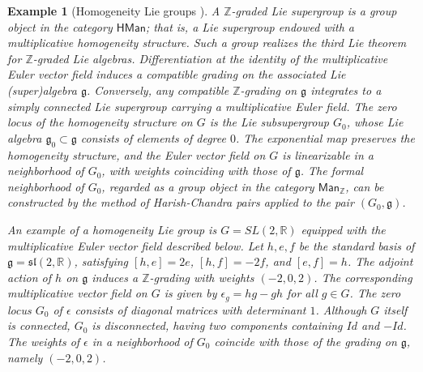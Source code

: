 \documentclass[a4paper,12pt]{amsart}
\newtheorem{example}{Example}
\begin{document}
\begin{example}[Homogeneity Lie groups \cite{KS-HCP}]\label{ex:homogeneity_group}\normalfont
    A $\mathbb{Z}$-graded Lie supergroup is a group object in the category 
$\mathsf{HMan}$; that is, a Lie supergroup endowed with a multiplicative 
homogeneity structure. Such a group realizes the third Lie theorem 
for $\mathbb{Z}$-graded Lie algebras. 
Differentiation at the identity of the multiplicative Euler vector field 
induces a compatible grading on the associated Lie (super)algebra 
$\mathfrak{g}$. Conversely, any compatible $\mathbb{Z}$-grading on 
$\mathfrak{g}$ integrates to a simply connected Lie supergroup 
carrying a multiplicative Euler field. 
The zero locus of the homogeneity structure on $G$ is the Lie subsupergroup $G_0$, whose Lie algebra $\mathfrak{g}_0 \subset \mathfrak{g}$ consists of 
elements of degree $0$. The exponential map preserves the homogeneity 
structure, and the Euler vector field on $G$ is linearizable in a neighborhood of $G_0$, with weights coinciding with those of $\mathfrak{g}$. The formal neighborhood of $G_0$, regarded as a group object in the category 
$\mathsf{Man}_{\mathbb{Z}}$, can be constructed by the method of Harish-Chandra pairs 
applied to the pair $(G_0, \mathfrak{g})$. 

\smallskip\noindent
An example of a homogeneity Lie group is $G = SL(2, \mathbb{R})$ equipped with 
the multiplicative Euler vector field described below. Let $h, e, f$ be the standard 
basis of $\mathfrak{g} = \mathfrak{sl}(2, \mathbb{R})$, satisfying 
$[h, e] = 2e$, $[h, f] = -2f$, and $[e, f] = h$. The adjoint action of $h$ on 
$\mathfrak{g}$ induces a $\mathbb{Z}$-grading with weights $(-2, 0, 2)$. 
The corresponding multiplicative vector field on $G$ is given by 
\(\epsilon_g = hg - gh\) for all \(g \in G\). 
The zero locus \(G_0\) of \(\epsilon\) consists of diagonal matrices 
with determinant \(1\). Although \(G\) itself is connected, \(G_0\) is disconnected, 
having two components containing \(Id\) and \(-Id\). The weights of \(\epsilon\) 
in a neighborhood of \(G_0\) coincide with those of the grading on 
\(\mathfrak{g}\), namely \( (-2, 0, 2)\).
\end{example}
\end{document}
